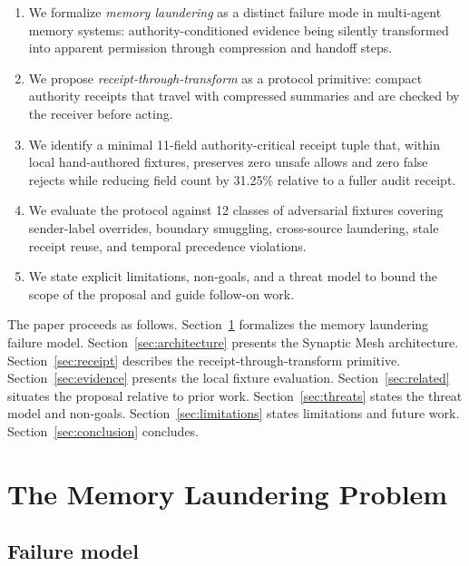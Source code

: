 \documentclass[11pt]{article}
\begin{document}
\begin{enumerate}
  \item We formalize \emph{memory laundering} as a distinct failure mode in
    multi-agent memory systems: authority-conditioned evidence being silently
    transformed into apparent permission through compression and handoff steps.
  \item We propose \emph{receipt-through-transform} as a protocol primitive: compact
    authority receipts that travel with compressed summaries and are checked by the
    receiver before acting.
  \item We identify a minimal 11-field authority-critical receipt tuple that, within
    local hand-authored fixtures, preserves zero unsafe allows and zero false rejects
    while reducing field count by 31.25\% relative to a fuller audit receipt.
  \item We evaluate the protocol against 12 classes of adversarial fixtures covering
    sender-label overrides, boundary smuggling, cross-source laundering, stale
    receipt reuse, and temporal precedence violations.
  \item We state explicit limitations, non-goals, and a threat model to bound the
    scope of the proposal and guide follow-on work.
\end{enumerate}

The paper proceeds as follows. Section~\ref{sec:problem} formalizes the memory
laundering failure model. Section~\ref{sec:architecture} presents the Synaptic Mesh
architecture. Section~\ref{sec:receipt} describes the receipt-through-transform
primitive. Section~\ref{sec:evidence} presents the local fixture evaluation.
Section~\ref{sec:related} situates the proposal relative to prior work.
Section~\ref{sec:threats} states the threat model and non-goals.
Section~\ref{sec:limitations} states limitations and future work.
Section~\ref{sec:conclusion} concludes.

\section{The Memory Laundering Problem}
\label{sec:problem}

\subsection{Failure model}
\end{document}
